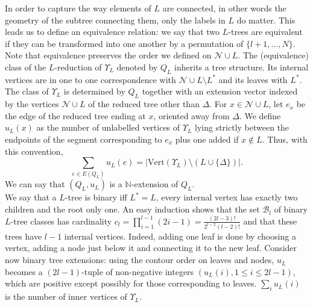 \documentclass[11pt]{article}
\begin{document}


In order to capture the way elements of $L$ are connected, in other words the geometry of the subtree connecting them, only the labels in $L$ do matter. This leads us to define an equivalence relation: we say that two $L$-trees are equivalent if they can be transformed into one another by a permutation of $ \{l+1,...,N\}$. Note that equivalence preserves the order we defined on $\mathcal N\cup L$. The (equivalence) class of the $L$-reduction of $\Upsilon_L$ denoted by $Q_L$ inherits a tree structure. Its internal vertices are in one to one correspondence with $\mathcal N\cup L\setminus L^*$ and its leaves with $L^*$. The class of \(\Upsilon_L\) is determined by \(Q_L\) together with an extension vector indexed by the vertices
\(\mathcal N\cup L\) of the reduced tree other than \(\Delta\). For
\(x\in\mathcal N\cup L\), let \(e_x\) be the edge of the reduced tree ending
at \(x\), oriented away from \(\Delta\). We define
$u_L(x)$ as the number of unlabelled vertices of \(\Upsilon_L\) lying strictly between the
endpoints of the segment corresponding to \(e_x\) plus one added if  $x \notin L$.
 Thus, with this convention,
\[
\sum_{e\in E(Q_L)}u_L(e)
=
|\mathrm{Vert}(\Upsilon_L)\setminus(L\cup\{\Delta\})|.\]
We can say that $(Q_L,u_L)$ is a $\mathbb N$-extension of $Q_L$.\\
 
  We say that a $L$-tree is binary iff $L^*=L$, every internal vertex has exactly two children and the root only one. An easy induction shows that the set $\mathcal  B_l$ of binary $L$-tree classes has cardinality $c_l=\prod_{i=1}^{l-1} (2i-1)= \frac{(2l-3)!}{2^{l-2}(l-2)!}$ and that these trees have $l-1$ internal vertices. Indeed, adding one leaf is done by choosing a vertex, adding  a node just below it and connecting it to the new leaf. Consider now binary tree extensions: using the contour order on leaves and nodes, $u_L$  becomes a $(2l-1)$-tuple of non-negative integers $(u_L(i), 1\leq i \leq 2l-1)$, which are positive except possibly for those corresponding to leaves. $\sum_i u_L(i) $ is the number of inner vertices of $\Upsilon _L$. \\ 
 
\end{document}
